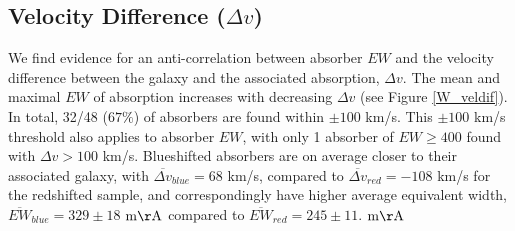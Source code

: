 \documentclass[iop]{emulateapj-rtx4}
\begin{document}





\subsection{Velocity Difference \rm($\Delta v$\rm)}

We find evidence for an anti-correlation between absorber $EW$ and the velocity difference between the galaxy and the associated absorption, $\Delta v$. The mean and maximal $EW$ of absorption increases with decreasing $\Delta v$ (see Figure \ref{W_veldif}). In total, 32/48 ($67\%$) of absorbers are found within $\pm100$ km/s. This $\pm100$ km/s threshold also applies to absorber $EW$, with only 1 absorber of $EW \geq 400$ found with $\Delta v > 100$ km/s. Blueshifted absorbers are on average closer to their associated galaxy, with $\overline{\Delta v}_{blue} = 68$ km/s, compared to $\overline{\Delta v}_{red}=-108$ km/s for the redshifted sample, and correspondingly have higher average equivalent width, $\overline{EW}_{blue}=329\pm18$ $\rm m\AA$ compared to $\overline{EW}_{red}=245\pm11$. $\rm m\AA$
\end{document}
